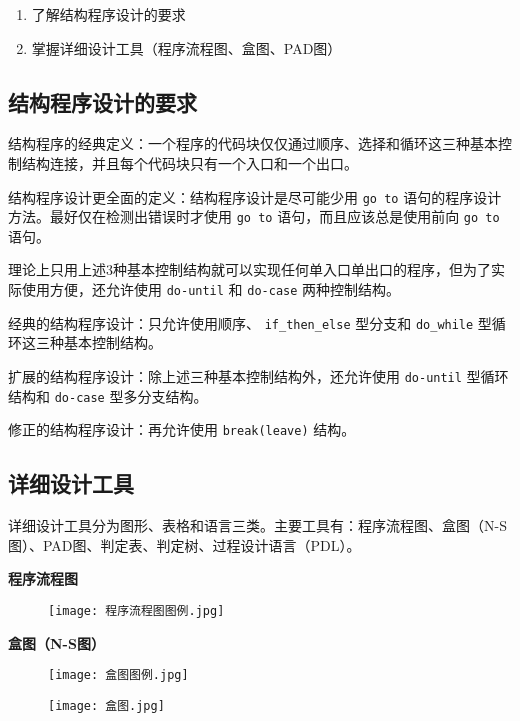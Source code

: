 \documentclass[cn, blue, normal, 12pt]{elegantnote}
\begin{document}
\begin{enumerate}
    \item 了解结构程序设计的要求
    \item 掌握详细设计工具（程序流程图、盒图、PAD图）
\end{enumerate}

\subsection{结构程序设计的要求}

结构程序的经典定义：一个程序的代码块仅仅通过顺序、选择和循环这三种基本控制结构连接，并且每个代码块只有一个入口和一个出口。

结构程序设计更全面的定义：结构程序设计是尽可能少用 \lstinline{go to} 语句的程序设计方法。最好仅在检测出错误时才使用 \lstinline{go to} 语句，而且应该总是使用前向 \lstinline{go to} 语句。

理论上只用上述3种基本控制结构就可以实现任何单入口单出口的程序，但为了实际使用方便，还允许使用 \lstinline{do-until} 和 \lstinline{do-case} 两种控制结构。

经典的结构程序设计：只允许使用顺序、 \lstinline{if_then_else} 型分支和 \lstinline{do_while} 型循环这三种基本控制结构。

扩展的结构程序设计：除上述三种基本控制结构外，还允许使用 \lstinline{do-until} 型循环结构和 \lstinline{do-case} 型多分支结构。

修正的结构程序设计：再允许使用 \lstinline{break(leave)} 结构。

\subsection{详细设计工具}

详细设计工具分为图形、表格和语言三类。主要工具有：程序流程图、盒图（N-S图）、PAD图、判定表、判定树、过程设计语言（PDL）。

\textbf{程序流程图}

\begin{figure}[htbp]
    \centering
    \texttt{[image: 程序流程图图例.jpg]}
\end{figure}

\textbf{盒图（N-S图）}

\begin{figure}[htbp]
    \centering
    \texttt{[image: 盒图图例.jpg]}
\end{figure}

\begin{figure}[htbp]
    \centering
    \texttt{[image: 盒图.jpg]}
\end{figure}
\end{document}
